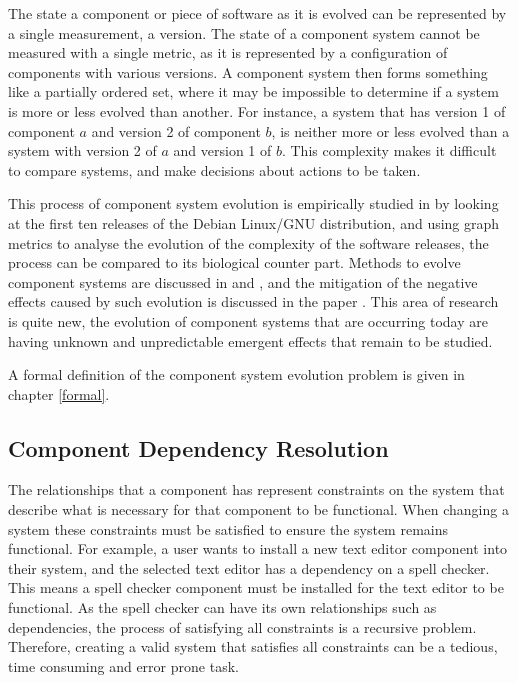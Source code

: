 The state a component or piece of software as it is evolved can be represented by a single measurement, a version.
The state of a component system cannot be measured with a single metric, as it is represented by a configuration of components with various versions.
A component system then forms something like a partially ordered set, where it may be impossible to determine if a system is more or less evolved than another.
For instance, a system that has version 1 of component $a$ and version 2 of component $b$, is neither more or less evolved than a system with version 2 of $a$ and version 1 of $b$.
This complexity makes it difficult to compare systems, and make decisions about actions to be taken.

This process of component system evolution is empirically studied in \citep{fortuna2011} by looking at the first ten releases of the Debian Linux/GNU distribution,
and using graph metrics to analyse the evolution of the complexity of the software releases, the process can be compared to its biological counter part.
Methods to evolve component systems are discussed in \citep{Ryan2005} and \citep{Luo2004},
and the mitigation of the negative effects caused by such evolution is discussed in the paper \citep{Stuckenholz2007}.
This area of research is quite new, the evolution of component systems that are occurring today are having unknown and unpredictable emergent effects that remain to be studied.

A formal definition of the component system evolution problem is given in chapter \ref{formal}.

\subsection{Component Dependency Resolution}
The relationships that a component has represent constraints on the system that describe what is necessary for that component to be functional.
When changing a system these constraints must be satisfied to ensure the system remains functional.
For example, a user wants to install a new text editor component into their system, and the selected text editor has a dependency on a spell checker.
This means a spell checker component must be installed for the text editor to be functional.
As the spell checker can have its own relationships such as dependencies, the process of satisfying all constraints is a recursive problem. 
Therefore, creating a valid system that satisfies all constraints can be a tedious, time consuming and error prone task.

